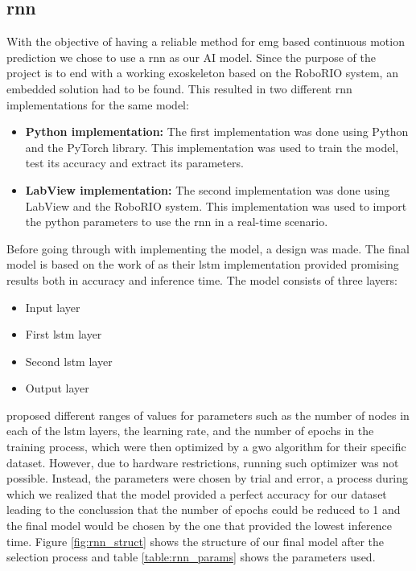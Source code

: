 \subsection{\acrfull{rnn}}
With the objective of having a reliable method for \acrshort{emg} based continuous motion prediction we chose to 
use a \acrshort{rnn} as our AI model. Since the purpose of the project is to end with a working exoskeleton based 
on the RoboRIO system, an embedded solution had to be found. This resulted in two different \acrshort{rnn} 
implementations for the same model:
\begin{itemize}

    \item \textbf{Python implementation:} The first implementation was done using Python and the PyTorch library. 
    This implementation was used to train the model, test its accuracy and extract its parameters.
    
    \item \textbf{LabView implementation:} The second implementation was done using LabView and the RoboRIO system. 
    This implementation was used to import the python parameters to use the \acrshort{rnn} in a real-time scenario.

\end{itemize}

Before going through with implementing the model, a design was made. The final model is based on the work of \cite{RNNEMG} 
as their \acrfull{lstm} implementation provided promising results both in accuracy and inference time. The model consists 
of three layers:
\begin{itemize}

    \item Input layer

    \item First \acrshort{lstm} layer

    \item Second \acrshort{lstm} layer
    
    \item Output layer

\end{itemize}

\cite{RNNEMG} proposed different ranges of values for parameters such as the number of nodes in each of the \acrshort{lstm} 
layers, the learning rate, and the number of epochs in the training process, which were then optimized by a \acrfull{gwo} 
algorithm for their specific dataset. However, due to hardware restrictions, running such optimizer was not possible. Instead, 
the parameters were chosen by trial and error, a process during which we realized that the model provided a perfect accuracy 
for our dataset leading to the conclussion that the number of epochs could be reduced to 1 and the final model would be chosen 
by the one that provided the lowest inference time. Figure \ref{fig:rnn_struct} shows the structure of our final model after 
the selection process and table \ref{table:rnn_params} shows the parameters used.

